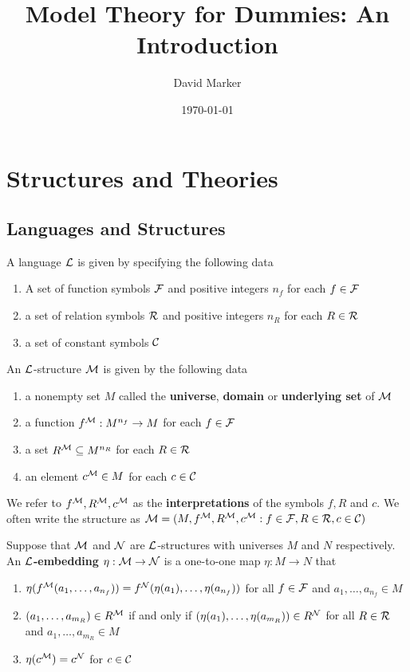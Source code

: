 \documentclass[11pt]{article}
\author{David Marker}
\date{\today}
\title{Model Theory for Dummies: An Introduction}
\begin{document}
\maketitle
\tableofcontents

\section{Structures and Theories}
\label{sec:orgd9da1ea}
\subsection{Languages and Structures}
\label{sec:org8d15780}
\begin{definition}[]
A language \(\mathcal{L}\) is given by specifying the following data
\begin{enumerate}
\item A set of function symbols \(\mathcal{F}\) and positive integers \(n_f\) for each
\(f\in\mathcal{F}\)
\item a set of relation symbols \(\mathcal{R}\) and positive integers \(n_R\) for each
\(R\in\mathcal{R}\)
\item a set of constant symbols \(\mathcal{C}\)
\end{enumerate}
\end{definition}

\begin{definition}[]
An \(\mathcal{L}\)-structure \(\mathcal{M}\) is given by the following data
\begin{enumerate}
\item a nonempty set \(M\) called the \textbf{universe}, \textbf{domain} or \textbf{underlying set}
of \(\mathcal{M}\)
\item a function \(f^{\mathcal{M}}:M^{n_f}\to M\) for each \(f\in\mathcal{F}\)
\item a set \(R^{\mathcal{M}}\subseteq M^{n_R}\) for each \(R\in\mathcal{R}\)
\item an element \(c^{\mathcal{M}}\in M\) for each \(c\in\mathcal{C}\)
\end{enumerate}
\end{definition}

We refer to \(f^{\mathcal{M}},R^{\mathcal{M}},c^{\mathcal{M}}\) as the \textbf{interpretations} of the
symbols \(f,R\) and \(c\). We often write the structure as
\(\mathcal{M}=(M,f^{\mathcal{M}},R^{\mathcal{M}},c^{\mathcal{M}}:f\in\mathcal{F},R\in\mathcal{R},c\in\mathcal{C})\)

\begin{definition}[]
Suppose that \(\mathcal{M}\) and \(\mathcal{N}\) are \(\mathcal{L}\)-structures with universes \(M\)
and \(N\) respectively. An \textbf{\(\mathcal{L}\)-embedding} \(\eta:\mathcal{M}\to\mathcal{N}\) is a
one-to-one map \(\eta:M\to N\) that
\begin{enumerate}
\item \(\eta(f^{\mathcal{M}}(a_1,\dots,a_{n_f}))=f^{\mathcal{N}}(\eta(a_1),\dots,\eta(a_{n_f}))\)
for all \(f\in\mathcal{F}\) and \(a_1,\dots,a_{n_f}\in M\)
\item \((a_1,\dots,a_{m_R})\in R^{\mathcal{M}}\) if and only if
\((\eta(a_1),\dots,\eta(a_{m_R}))\in R^{\mathcal{N}}\) for all \(R\in\mathcal{R}\) and
\(a_1,\dots,a_{m_R}\in M\)
\item \(\eta(c^{\mathcal{M}})=c^{\mathcal{N}}\) for \(c\in\mathcal{C}\)
\end{enumerate}
\end{definition}
\end{document}
